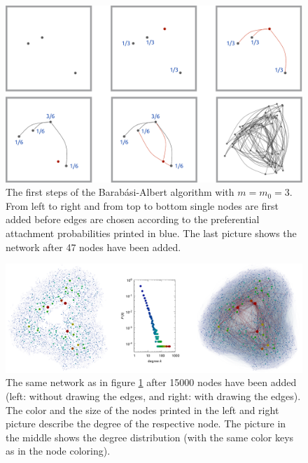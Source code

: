 \documentclass{scrartcl}
\begin{document}
\begin{figure}
    \includegraphics[width=\textwidth]{pictures/21_begin.pdf}
    \caption{The first steps of the Barab\'asi-Albert algorithm with $m
    = m_0 = 3$. From left to right and from top to bottom single nodes are
    first added before edges are chosen according to the preferential
    attachment probabilities printed in blue. The last picture shows the network
    after 47 nodes have been added.}
    \label{fig:21_begin}
\end{figure}

\begin{figure}
    \includegraphics[width=\textwidth]{pictures/21_end.pdf}
    \caption{The same network as in figure \ref{fig:21_begin} after 15000
    nodes have been added (left: without drawing the edges, and right: with
    drawing the edges). The color and the size of the nodes printed in the left
    and right picture describe the degree of the respective node. The
    picture in the middle shows the degree distribution (with the same color
    keys as in the node coloring).}
    \label{fig:21_end}
\end{figure}
\end{document}
